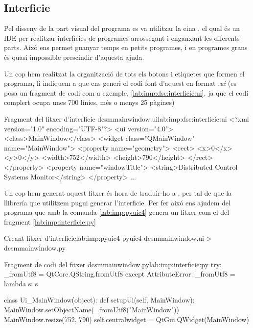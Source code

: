 \subsection{Interficie}\label{cap:imp:visual}

Pel disseny de la part visual del programa es va utilitzar la eina \QTCreator, el qual és un IDE per realitzar interfìcies de programes arrossegant i enganxant les diferents parts. Això ens permet guanyar temps en petits programes, i en programes grans és quasi impossible prescindir d'aquesta ajuda.

Un cop hem realitzat la organització de tots els botons i etiquetes que formen el programa, li indiquem a \QTCreator que ens generi el codi font d'aquest en format \textit{.ui} (es posa un fragment de codi com a exemple, \ref{lab:imp:dsc:interficie:ui}, ja que el codi complert ocupa unes 700 línies, més o menys 25 pàgines)

\begin{code_xml}{Fragment del fitxer d'interficie dcsmmainwindow.ui}{lab:imp:dsc:interficie:ui}
<?xml version="1.0" encoding="UTF-8"?>
<ui version="4.0">
 <class>MainWindow</class>
 <widget class="QMainWindow" name="MainWindow">
  <property name="geometry">
   <rect>
    <x>0</x>
    <y>0</y>
    <width>752</width>
    <height>790</height>
   </rect>
  </property>
  <property name="windowTitle">
   <string>Distributed Control Systems Monitor</string>
  </property>
     ...
\end{code_xml}

Un cop hem generat aquest fitxer és hora de traduir-ho a \Python, per tal de que la llibrería que utilitzem \PyQT pugui generar l'interficie. Per fer aixó ens ajudem del programa \pyuic que amb la comanda \ref{lab:imp:pyuic4} genera un fitxer com el del fragment \ref{lab:imp:interficie:py}

\begin{code_bash}{Creant fitxer d'interficie}{lab:imp:pyuic4}
pyuic4 dcsmmainwindow.ui > dcsmmainwindow.py
\end{code_bash}

\begin{code_python}{Fragment de codi del fitxer dcsmmainwindow.py}{lab:imp:interficie:py}
try:
    _fromUtf8 = QtCore.QString.fromUtf8
except AttributeError:
    _fromUtf8 = lambda s: s

class Ui_MainWindow(object):
    def setupUi(self, MainWindow):
        MainWindow.setObjectName(_fromUtf8("MainWindow"))
        MainWindow.resize(752, 790)
        self.centralwidget = QtGui.QWidget(MainWindow)
\end{code_python}

